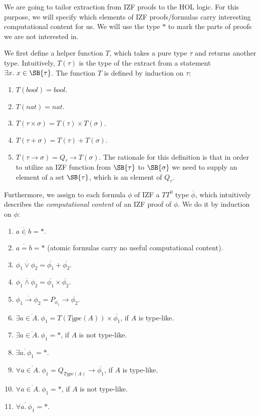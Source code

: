 \documentclass{LMCS}
\newcommand{\ov}[1]{\ensuremath{\overline{#1}}}
\newcommand{\ST}{*}
\begin{document}
We are going to tailor extraction from IZF proofs to the HOL logic. For this purpose, we
will specify which elements of IZF proofs/formulas carry interesting
computational content for us. We will use the type $\ST$ to mark the parts of
proofs we are not interested in.

We first define a helper function $T$, which takes a pure type $\tau$ and
returns another type. Intuitively, $T(\tau)$ is the type of the extract from
a statement $\exists x.\ x \in \SB{\tau}$. The function $T$ is defined by induction on $\tau$:
\begin{enumerate}[$\bullet$]
\item $T(bool) = bool$. 
\item $T(nat) = nat$.
\item $T(\tau \times \sigma) = T(\tau) \times T(\sigma)$. 
\item $T(\tau + \sigma) = T(\tau) + T(\sigma)$. 
\item $T(\tau \to \sigma) = Q_{\tau} \to T(\sigma)$. The rationale for this
definition is that in order to utilize an IZF function from $\SB{\tau}$ to $\SB{\sigma}$ we need to supply an element
of a set $\SB{\tau}$, which is an element of $Q_\tau$. 
\end{enumerate}

Furthermore, we assign to each formula $\phi$ of IZF a $TT^0$ type $\ov{\phi}$,
which intuitively describes the \emph{computational content} of an IZF proof of
$\phi$. We do it by induction on $\phi$:

\begin{enumerate}[$\bullet$]
\item $\ov{a \in b} = \ST$. 
\item $\ov{a = b} = \ST$ (atomic formulas carry no useful computational content). 
\item $\ov{\phi_1 \lor \phi_2} = \ov{\phi_1} + \ov{\phi_2}$.
\item $\ov{\phi_1 \land \phi_2} = \ov{\phi_1} \times \ov{\phi_2}$.
\item $\ov{\phi_1 \to \phi_2} = P_{\phi_1} \to \ov{\phi_2}$.
\item $\ov{\exists a \in A.\ \phi_1} = T(Type(A)) \times \ov{\phi_1}$, if $A$ is
type-like. 
\item $\ov{\exists a \in A.\ \phi_1} = \ST$, if $A$ is not type-like.
\item $\ov{\exists a.\ \phi_1} = \ST$.
\item $\ov{\forall a \in A.\ \phi_1} = Q_{Type(A)} \to \ov{\phi_1}$, if $A$ is type-like. 
\item $\ov{\forall a \in A.\ \phi_1} = \ST$, if $A$ is not type-like. 
\item $\ov{\forall a.\ \phi_1} = \ST$.
\end{enumerate}
\end{document}
